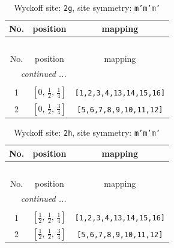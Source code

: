 \documentclass[fleqn,8pt]{jsarticle}
\begin{document}
\begin{longtable}{ccc}
\caption{Wyckoff site: {\tt 2g}, site symmetry: {\tt m'm'm'}}
 \\
 \hline \hline
No. & position & mapping \\ \hline \endfirsthead

\multicolumn{2}{l}{\tablename\ \thetable{}} \\
 \hline \hline
No. & position & mapping \\ \hline \endhead

 \hline \hline
\multicolumn{2}{r}{\footnotesize\it continued ...} \\ \endfoot

 \hline \hline
\multicolumn{2}{r}{} \\ \endlastfoot

1 & $\left[ 0,\, \frac{1}{2},\, \frac{1}{4} \right]$ & {\tt [1,2,3,4,13,14,15,16]} \\ \hline
2 & $\left[ 0,\, \frac{1}{2},\, \frac{3}{4} \right]$ & {\tt [5,6,7,8,9,10,11,12]} \\
\end{longtable}
\renewcommand{\arraystretch}{1.2}
\begin{longtable}{ccc}
\caption{Wyckoff site: {\tt 2h}, site symmetry: {\tt m'm'm'}}
 \\
 \hline \hline
No. & position & mapping \\ \hline \endfirsthead

\multicolumn{2}{l}{\tablename\ \thetable{}} \\
 \hline \hline
No. & position & mapping \\ \hline \endhead

 \hline \hline
\multicolumn{2}{r}{\footnotesize\it continued ...} \\ \endfoot

 \hline \hline
\multicolumn{2}{r}{} \\ \endlastfoot

1 & $\left[ \frac{1}{2},\, \frac{1}{2},\, \frac{1}{4} \right]$ & {\tt [1,2,3,4,13,14,15,16]} \\ \hline
2 & $\left[ \frac{1}{2},\, \frac{1}{2},\, \frac{3}{4} \right]$ & {\tt [5,6,7,8,9,10,11,12]} \\
\end{longtable}
\renewcommand{\arraystretch}{1.2}
\end{document}
